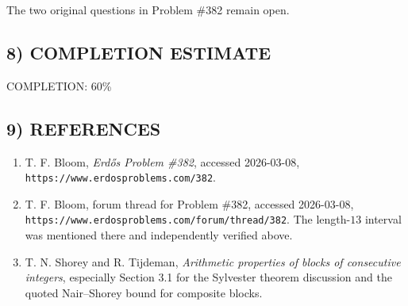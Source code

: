 The two original questions in Problem \#382 remain open.

\subsection*{8) COMPLETION ESTIMATE}

COMPLETION: 60\%

\subsection*{9) REFERENCES}

\begin{enumerate}
\item T. F. Bloom, \emph{Erd\H{o}s Problem \#382}, accessed 2026-03-08, \texttt{https://www.erdosproblems.com/382}.
\item T. F. Bloom, forum thread for Problem \#382, accessed 2026-03-08, \texttt{https://www.erdosproblems.com/forum/thread/382}. The length-$13$ interval was mentioned there and independently verified above.
\item T. N. Shorey and R. Tijdeman, \emph{Arithmetic properties of blocks of consecutive integers}, especially Section 3.1 for the Sylvester theorem discussion and the quoted Nair--Shorey bound for composite blocks.
\end{enumerate}

